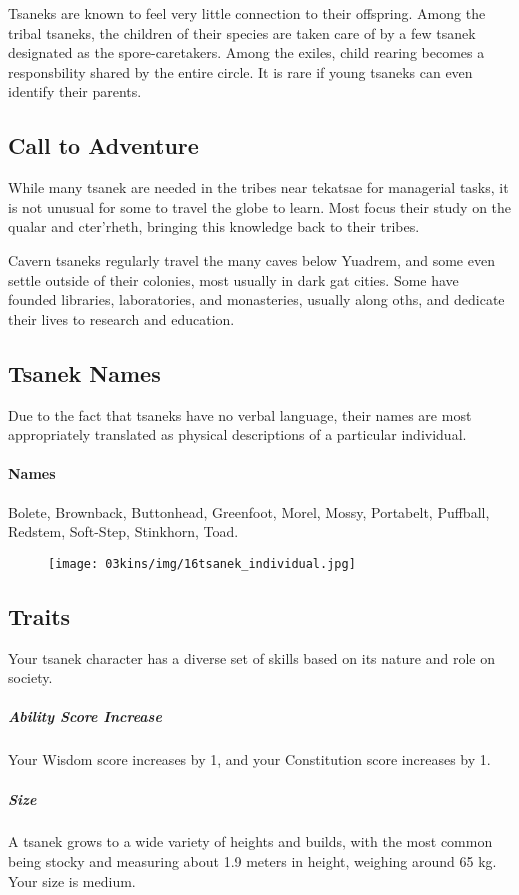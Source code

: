Tsaneks are known to feel very little connection to their offspring.
Among the tribal tsaneks, the children of their species are taken care of by a few tsanek designated as the spore-caretakers.
Among the exiles, child rearing becomes a responsbility shared by the entire circle.
It is rare if young tsaneks can even identify their parents.

\subsection*{Call to Adventure}
While many tsanek are needed in the tribes near tekatsae for managerial tasks, it is not unusual for some to travel the globe to learn.
Most focus their study on the qualar and cter'rheth, bringing this knowledge back to their tribes.

Cavern tsaneks regularly travel the many caves below Yuadrem, and some even settle outside of their colonies, most usually in dark gat cities.
Some have founded libraries, laboratories, and monasteries, usually along oths, and dedicate their lives to research and education.

\subsection*{Tsanek Names}
Due to the fact that tsaneks have no verbal language, their names are most appropriately translated as physical descriptions of a particular individual.

\paragraph{Names} Bolete, Brownback, Buttonhead, Greenfoot, Morel, Mossy, Portabelt, Puffball, Redstem, Soft-Step, Stinkhorn, Toad.

\begin{figure}[!t]
    \centering
    \texttt{[image: 03kins/img/16tsanek\_individual.jpg]}
\end{figure}

\subsection*{Traits}
Your tsanek character has a diverse set of skills based on its nature and role on society.

\subparagraph{Ability Score Increase} Your Wisdom score increases by 1, and your Constitution score increases by 1.

\subparagraph{Size} A tsanek grows to a wide variety of heights and builds, with the most common being stocky and measuring about 1.9 meters in height, weighing around 65 kg.
Your size is medium.

